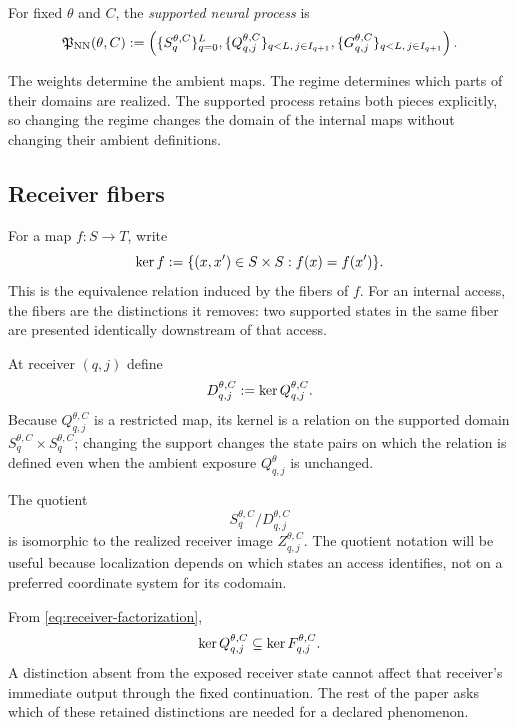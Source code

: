 \begin{definition}
For fixed $\theta$ and $C$, the \emph{supported neural process} is
\begin{equation}
\mathfrak{P}_{\mathrm{NN}}(\theta,C)
:=
\left(
\{S_q^{\theta,C}\}_{q=0}^L,
\{Q_{q,j}^{\theta,C}\}_{q<L,\,j\in I_{q+1}},
\{G_{q,j}^{\theta,C}\}_{q<L,\,j\in I_{q+1}}
\right).
\label{eq:supported-process}
\end{equation}
\end{definition}

The weights determine the ambient maps. The regime determines which parts of their domains are realized. The supported process retains both pieces explicitly, so changing the regime changes the domain of the internal maps without changing their ambient definitions.

\subsection{Receiver fibers}

For a map $f:S\to T$, write
\[
\operatorname{ker} f
:=
\{(x,x')\in S\times S:f(x)=f(x')\}.
\]
This is the equivalence relation induced by the fibers of $f$. For an internal access, the fibers are the distinctions it removes: two supported states in the same fiber are presented identically downstream of that access.

At receiver $(q,j)$ define
\begin{equation}
D_{q,j}^{\theta,C}:=
\operatorname{ker} Q_{q,j}^{\theta,C}.
\label{eq:receiver-kernel}
\end{equation}
Because $Q_{q,j}^{\theta,C}$ is a restricted map, its kernel is a relation on the supported domain $S_q^{\theta,C}\times S_q^{\theta,C}$; changing the support changes the state pairs on which the relation is defined even when the ambient exposure $Q_{q,j}^{\theta}$ is unchanged.

The quotient
\[
S_q^{\theta,C}/D_{q,j}^{\theta,C}
\]
is isomorphic to the realized receiver image $Z_{q,j}^{\theta,C}$. The quotient notation will be useful because localization depends on which states an access identifies, not on a preferred coordinate system for its codomain.

From \eqref{eq:receiver-factorization},
\begin{equation}
\operatorname{ker} Q_{q,j}^{\theta,C}
\subseteq
\operatorname{ker} F_{q,j}^{\theta,C}.
\label{eq:receiver-no-recovery}
\end{equation}
A distinction absent from the exposed receiver state cannot affect that receiver's immediate output through the fixed continuation. The rest of the paper asks which of these retained distinctions are needed for a declared phenomenon.
